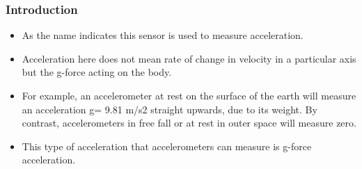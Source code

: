 \documentclass[table,10pt,red]{beamer}	%
\begin{document}
\begin{frame}
	\frametitle{Introduction}
 		
 		\color{black} 
\pause

			\begin{itemize}
\justifying
\item <+-|alert@+>    As the name indicates this sensor is used to measure acceleration. 
\item <+-|alert@+> Acceleration here does not mean rate of change in velocity in a particular axis but the g-force acting on the body.
\item <+-|alert@+> 	For example, an accelerometer at rest on the surface of the earth will measure an acceleration g= 9.81 m/s2 straight upwards, due to its weight. By contrast, accelerometers in free fall or at rest in outer space will measure zero.
\item <+-|alert@+> This type of acceleration that accelerometers can measure is g-force acceleration.
\end{itemize}
\end{frame}

\end{document}
